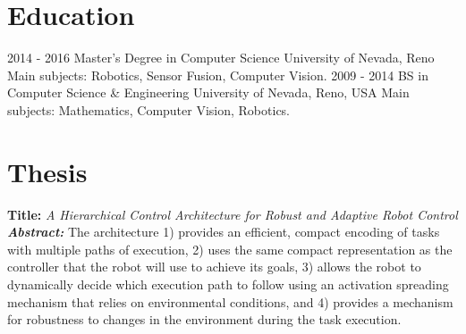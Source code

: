 \documentclass[]{friggeri-cv}
\begin{document}
\section{Education}
\begin{entrylist}
  \entry
    {2014 - 2016}
    {Master's Degree in Computer Science}
    {University of Nevada, Reno}
    {Main subjects: Robotics, Sensor Fusion, Computer Vision.}
  \entry
    {2009 - 2014}
    {BS in Computer Science \& Engineering}
    {University of Nevada, Reno, USA}
    {Main subjects: Mathematics, Computer Vision, Robotics.}
\end{entrylist}

\section{Thesis}
{\textbf{Title:} \emph{A Hierarchical Control Architecture for Robust and Adaptive Robot Control \\ \textbf{Abstract:}}}
{The architecture 1) provides an efficient, compact encoding of tasks with multiple paths of execution, 2) uses the same compact representation as the controller that the robot will use to achieve its goals, 3) allows the robot to dynamically decide which execution path to follow using an activation spreading mechanism that relies on environmental conditions, and 4) provides a mechanism for robustness to changes in the environment during the task execution.}

\end{document}
